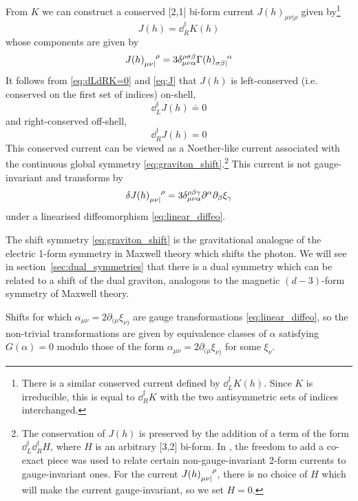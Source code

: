 From $K$ we can construct a conserved [2,1] bi-form current $J(h)_{\mu\nu|\rho}$ given by\footnote{There is a similar conserved current defined  by $\dd_L^\dag K(h)$. Since $K$ is irreducible, this is equal to $\dd_R^\dag K$ with the two antisymmetric sets of  indices interchanged.}
\begin{equation}\label{eq:J}
    J(h) = \dd_R^\dag K(h)
\end{equation}
whose components are given by
\begin{equation}\label{JGam}
    J(h)\indices{_{\mu\nu|}^\rho} = 3 \delta_{\mu\nu\alpha}^{\rho\sigma\beta} \Gamma(h)\indices{_{\sigma\beta|}^\alpha}
\end{equation}
It  follows from \eqref{eq:dLdRK=0} and \eqref{eq:J} that $J(h)$ is left-conserved (i.e. conserved on the first set of indices) on-shell,
\begin{equation}\label{eq:J(h)_conservations}
    \dd_L^\dag J(h) \doteq 0
\end{equation}
and right-conserved off-shell,
\begin{equation}\label{eq:J_right_conserved}
    \dd_R^\dag J(h) = 0
\end{equation}
This conserved current can be viewed as a Noether-like current
associated with the continuous global symmetry \eqref{eq:graviton_shift}.\footnote{The conservation of $J(h)$ is preserved by the addition of a term of the form $\dd^\dag_L \dd^\dag_R H$, where $H$ is an arbitrary [3,2] bi-form.
In \cite{Hull:2024xgo, Hull:2024mfb}, the freedom to add a co-exact piece was used to relate certain non-gauge-invariant 2-form currents to gauge-invariant ones.
For the current $J(h)\indices{_{\mu\nu|}^\rho}$, there is no choice of $H$ which will make the current gauge-invariant, so we set $H=0$.} 
This current is not gauge-invariant and transforms by
\begin{equation}
    \delta J(h)\indices{_{\mu\nu|}^\rho} = 3 \delta_{\mu\nu\alpha}^{\rho\beta\gamma} \partial^\alpha \partial_\beta \xi_\gamma
\end{equation}
under a linearised diffeomorphism \eqref{eq:linear_diffeo}.

The shift symmetry \eqref{eq:graviton_shift} is the gravitational analogue of the electric 1-form symmetry in Maxwell theory which shifts the photon. We will see in section~\ref{sec:dual_symmetries} that there is a dual symmetry which can be related to a shift of the dual graviton, analogous to the magnetic $(d-3)$-form symmetry of Maxwell theory.

Shifts for which $\alpha_{\mu\nu} = 2 \partial_{(\mu}\xi_{\nu)}$ are gauge transformations \eqref{eq:linear_diffeo}, so the non-trivial transformations are given by equivalence classes of $\alpha$ satisfying $G(\alpha)=0$ modulo those  of the form $\alpha_{\mu\nu} = 2 \partial_{(\mu}\xi_{\nu)}$ for some $\xi_\nu$.

